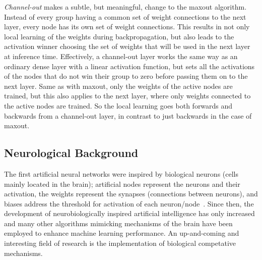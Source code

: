 

        \textit{Channel-out} makes a subtle, but meaningful, change to the maxout algorithm. Instead of every group having a common set of weight connections to the next layer, every node has its own set of weight connections. This results in not only local learning of the weights during backpropagation, but also leads to the activation winner choosing the set of weights that will be used in the next layer at inference time.
        Effectively, a channel-out layer works the same way as an ordinary dense layer with a linear activation function, but sets all the activations of the nodes that do not win their group to zero before passing them on to the next layer.
        Same as with maxout, only the weights of the active nodes are trained, but this also applies to the next layer, where only weights connected to the active nodes are trained. So the local learning goes both forwards and backwards from a channel-out layer, in contrast to just backwards in the case of maxout.

    \subsection{Neurological Background}
        The first artificial neural networks were inspired by biological neurons (cells mainly located in the brain); artificial nodes represent the neurons and their activation, the weights represent the synapses (connections between neurons), and biases address the threshold for activation of each neuron/node~\citep{Project2}. Since then, the development of neurobiologically inspired artificial intelligence has only increased and many other algorithms mimicking mechanisms of the brain have been employed to enhance machine learning performance. An up-and-coming and interesting field of research is the implementation of biological competative mechanisms. 
        
